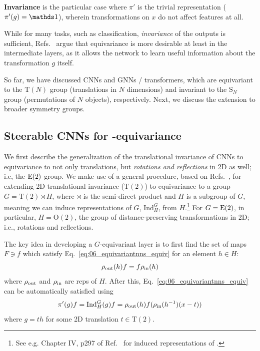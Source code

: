 \begin{definition}
    \textbf{Invariance} is the particular case where $\pi'$ is the trivial representation ($\pi'(g) = \identity$), wherein transformations on $x$ do not affect features at all.
\end{definition}

While for many tasks, such as classification, \textit{invariance} of the outputs is sufficient, Refs.~\cite{worrall2017harmonic, cohen2016steerable} argue that equivariance is more desirable at least in the intermediate layers, as it allows the network to learn useful information about the transformation $g$ itself. 

So far, we have discussed CNNs and GNNs / transformers, which are equivariant to the $\mathrm T(N)$ group (translations in $N$ dimensions) and invariant to the $\mathrm S_N$ group (permutations of $N$ objects), respectively. 
Next, we discuss the extension to broader symmetry groups. 


\subsection{Steerable CNNs for \texorpdfstring{\EE[2]}{E(2)}-equivariance}
\label{sec:06_equivariantnns_e2}

We first describe the generalization of the translational invariance of CNNs to equivariance to not only translations, but \textit{rotations and reflections} in 2D as well; i.e, the $\EE[2]$ group.
We make use of a general procedure, based on Refs.~\cite{cohen2016group, cohen2016steerable}, for extending 2D translational invariance ($\mathrm T(2)$) to equivariance to a group $G =  \mathrm T(2)\rtimes H$, where $\rtimes$ is the semi-direct product and $H$ is a subgroup of $G$, meaning we can induce representations of $G$, $\mathrm{Ind}^G_H$, from $H$.\footnote{See e.g. Chapter IV, p297 of Ref.~\cite{Zee:2016fuk} for induced representations of \EE[2].} 
For $G = \EE[2]$, in particular, $H = \mathrm O(2)$, the group of distance-preserving transformations in 2D; i.e., rotations and reflections.

The key idea in developing a $G$-equivariant layer is to first find the set of maps $F \ni f$ which satisfy Eq.~\ref{eq:06_equivariantnns_equiv} for an element $h \in H$:
\begin{equation}\label{eq:06_equivariantnns_equiv2}
    \rho_\mathrm{out}(h)f = f\rho_\mathrm{in}(h)
\end{equation}
where $\rho_\mathrm{out}$ and $\rho_\mathrm{in}$ are reps of $H$. After this, Eq.~\ref{eq:06_equivariantnns_equiv} can be automatically satisfied using 
\begin{equation}
    \pi'(g)f = \mathrm{Ind}^G_H(g)f = \rho_\mathrm{out}(h)f(\rho_\mathrm{in}(h^{-1})(x-t)) 
\end{equation}
where $g = th$ for some 2D translation $t \in \mathrm T(2)$. 

